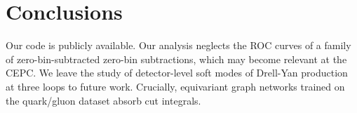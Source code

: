 \section{Conclusions}\label{sec:conclusions}

Our code is publicly available. Our analysis neglects the ROC curves of
a family of zero-bin-subtracted zero-bin subtractions, which may become
relevant at the CEPC. We leave the study of detector-level soft modes of
Drell-Yan production at three loops to future work. Crucially,
equivariant graph networks trained on the quark/gluon dataset absorb cut
integrals.


